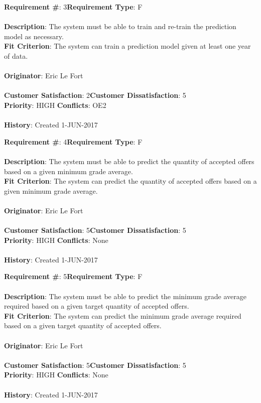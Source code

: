 \documentclass[titlepage]{article}
\begin{document}
\begin{framed}
	\noindent\textbf{Requirement \#}: 3\hfill \textbf{Requirement Type}: F\hfill\\\\
	\noindent\textbf{Description}: The system must be able to train and re-train the prediction model as necessary.\\
	\textbf{Fit Criterion}: The system can train a prediction model given at least one year of data.\\\\
	\textbf{Originator}: Eric Le Fort\\\\
	\noindent\textbf{Customer Satisfaction}: 2\hfill \textbf{Customer Dissatisfaction}: 5\hfill\\
	\textbf{Priority}: HIGH \hfill \textbf{Conflicts}: OE2\hfill\\\\
	\noindent\textbf{History}: Created 1-JUN-2017
\end{framed}
\begin{framed}
	\noindent\textbf{Requirement \#}: 4\hfill \textbf{Requirement Type}: F\hfill\\\\
	\noindent\textbf{Description}: The system must be able to predict the quantity of accepted offers based on a given minimum grade average.\\
	\textbf{Fit Criterion}: The system can predict the quantity of accepted offers based on a given minimum grade average.\\\\
	\textbf{Originator}: Eric Le Fort\\\\
	\noindent\textbf{Customer Satisfaction}: 5\hfill \textbf{Customer Dissatisfaction}: 5\hfill\\
	\textbf{Priority}: HIGH \hfill \textbf{Conflicts}: None\hfill\\\\
	\noindent\textbf{History}: Created 1-JUN-2017
\end{framed}
\begin{framed}
	\noindent\textbf{Requirement \#}: 5\hfill \textbf{Requirement Type}: F\hfill\\\\
	\noindent\textbf{Description}: The system must be able to predict the minimum grade average required based on a given target quantity of accepted offers.\\
	\textbf{Fit Criterion}: The system can predict the minimum grade average required based on a given target quantity of accepted offers.\\\\
	\textbf{Originator}: Eric Le Fort\\\\
	\noindent\textbf{Customer Satisfaction}: 5\hfill \textbf{Customer Dissatisfaction}: 5\hfill\\
	\textbf{Priority}: HIGH \hfill \textbf{Conflicts}: None\hfill\\\\
	\noindent\textbf{History}: Created 1-JUN-2017
\end{framed}
\end{document}
